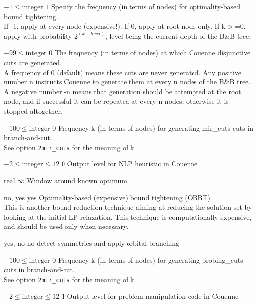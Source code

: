 %
{$-1\leq\textrm{integer}$}%
{$1$}%
{Specify the frequency (in terms of nodes) for optimality-based bound tightening.\\
If -1, apply at every node (expensive!). If 0, apply at root node only. If k$>$=0, apply with probability $2^{(k - level)}$, level being the current depth of the B\&B tree.}%
{}

%
{$-99\leq\textrm{integer}$}%
{$0$}%
{The frequency (in terms of nodes) at which Couenne disjunctive cuts are generated.\\
A frequency of 0 (default) means these cuts are never generated. Any positive number n instructs Couenne to generate them at every n nodes of the B\&B tree. A negative number -n means that generation should be attempted at the root node, and if successful it can be repeated at every n nodes, otherwise it is stopped altogether.}%
{}

%
{$-100\leq\textrm{integer}$}%
{$0$}%
{Frequency k (in terms of nodes) for generating mir\_cuts cuts in branch-and-cut.\\
See option \texttt{2mir\_cuts} for the meaning of k.}%
{}

%
{$-2\leq\textrm{integer}\leq12$}%
{$0$}%
{Output level for NLP heuristic in Couenne}%
{}

%
{$\textrm{real}$}%
{$\infty$}%
{Window around known optimum.}%
{}

%
{\ttfamily no, yes}%
{yes}%
{Optimality-based (expensive) bound tightening (OBBT)\\
This is another bound reduction technique aiming at reducing the solution set by looking at the initial LP relaxation. This technique is computationally expensive, and should be used only when necessary.}%
{}

%
{\ttfamily yes, no}%
{no}%
{detect symmetries and apply orbital branching}%
{}

%
{$-100\leq\textrm{integer}$}%
{$0$}%
{Frequency k (in terms of nodes) for generating probing\_cuts cuts in branch-and-cut.\\
See option \texttt{2mir\_cuts} for the meaning of k.}%
{}

%
{$-2\leq\textrm{integer}\leq12$}%
{$1$}%
{Output level for problem manipulation code in Couenne}%
{}

